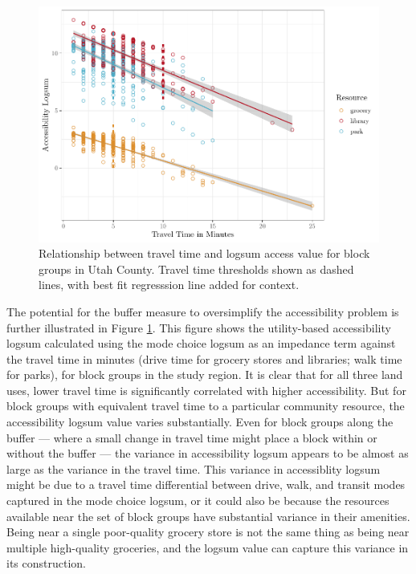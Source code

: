 \documentclass[ijerph,article,submit,moreauthors,pdftex]{mdpi}
\begin{document}
\begin{figure}
\centering
\includegraphics{Community_Resources_files/figure-latex/access-plot-1.pdf}
\caption{\label{fig:access-plot}Relationship between travel time and logsum access value for block groups in Utah County. Travel time thresholds shown as dashed lines, with best fit regresssion line added for context.}
\end{figure}

The potential for the buffer measure to oversimplify the accessibility problem is further
illustrated in
Figure \ref{fig:access-plot}. This figure shows the utility-based accessibility
logsum calculated using the mode choice logsum as an impedance term against the
travel time in minutes (drive time for grocery stores and libraries; walk time
for parks), for block groups in the study region. It is clear that for all three
land uses,
lower travel time is significantly correlated with higher accessibility.
But for block groups with equivalent travel time to a particular community
resource, the accessibility logsum value
varies substantially. Even for block groups along the buffer --- where a small change
in travel time might place a block within or without the buffer --- the variance
in accessibility logsum appears to be almost as large as the variance
in the travel time. This variance in accessiblity logsum might be due to a
travel time differential between drive, walk, and transit modes captured in the
mode choice logsum, or it could also be because the resources available near the
set of block groups have substantial variance in their amenities. Being near a
single poor-quality grocery store is not the same thing as being near multiple
high-quality groceries, and the logsum value can capture this variance in its
construction.
\end{document}

